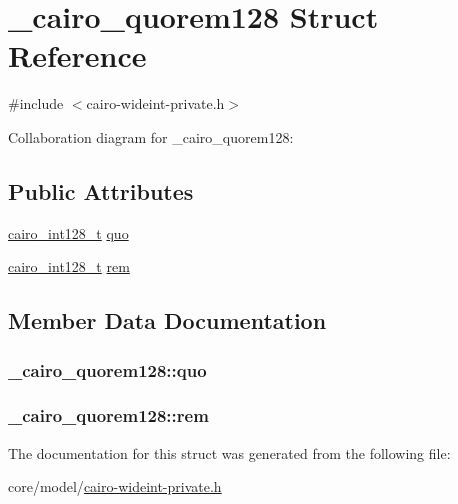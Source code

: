 \hypertarget{struct__cairo__quorem128}{}\section{\+\_\+cairo\+\_\+quorem128 Struct Reference}
\label{struct__cairo__quorem128}


{\ttfamily \#include $<$cairo-\/wideint-\/private.\+h$>$}



Collaboration diagram for \+\_\+cairo\+\_\+quorem128\+:
\subsection*{Public Attributes}
\begin{DoxyCompactItemize}
\item 
\hyperlink{cairo-wideint-private_8h_adb77a91a0053b771957b37c1a822a228}{cairo\+\_\+int128\+\_\+t} \hyperlink{struct__cairo__quorem128_ade35c1c7e37db3edc2e3d72abe36f988}{quo}
\item 
\hyperlink{cairo-wideint-private_8h_adb77a91a0053b771957b37c1a822a228}{cairo\+\_\+int128\+\_\+t} \hyperlink{struct__cairo__quorem128_af0629874ad1fd0eec397362fb7ffc929}{rem}
\end{DoxyCompactItemize}


\subsection{Member Data Documentation}
\subsubsection[{\texorpdfstring{quo}{quo}}]{ \+\_\+cairo\+\_\+quorem128\+::quo}\hypertarget{struct__cairo__quorem128_ade35c1c7e37db3edc2e3d72abe36f988}{}\label{struct__cairo__quorem128_ade35c1c7e37db3edc2e3d72abe36f988}
\subsubsection[{\texorpdfstring{rem}{rem}}]{ \+\_\+cairo\+\_\+quorem128\+::rem}\hypertarget{struct__cairo__quorem128_af0629874ad1fd0eec397362fb7ffc929}{}\label{struct__cairo__quorem128_af0629874ad1fd0eec397362fb7ffc929}


The documentation for this struct was generated from the following file\+:\begin{DoxyCompactItemize}
\item 
core/model/\hyperlink{cairo-wideint-private_8h}{cairo-\/wideint-\/private.\+h}\end{DoxyCompactItemize}
